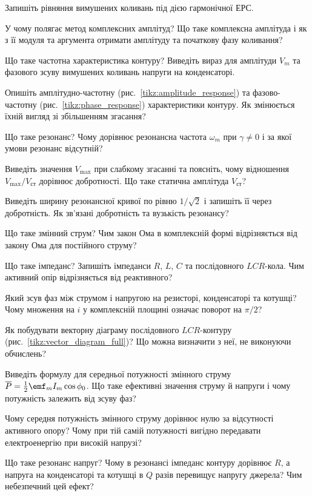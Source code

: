 \begin{Questions}
\begin{quizlist}
	\item Запишіть рівняння вимушених коливань під дією гармонічної ЕРС.
	\item У чому полягає метод комплексних амплітуд? Що таке комплексна амплітуда і як з її модуля та аргумента отримати амплітуду та початкову фазу коливання?
	\item Що таке частотна характеристика контуру? Виведіть вираз для амплітуди $V_m$ та фазового зсуву вимушених коливань напруги на конденсаторі.
	\item Опишіть амплітудно-частотну (рис.~\ref{tikz:amplitude_response}) та фазово-частотну (рис.~\ref{tikz:phase_response}) характеристики контуру. Як змінюється їхній вигляд зі збільшенням згасання?
	\item Що таке резонанс? Чому дорівнює резонансна частота $\omega_m$ при $\gamma\ne0$ і за якої умови резонанс відсутній?
	\item Виведіть значення $V_{\max}$ при слабкому згасанні та поясніть, чому відношення $V_{\max}/V_{\text{ст}}$ дорівнює добротності. Що таке статична амплітуда $V_{\text{ст}}$?
	\item Виведіть ширину резонансної кривої по рівню $1/\sqrt2$ і запишіть її через добротність. Як зв'язані добротність та вузькість резонансу?
	\item Що таке змінний струм? Чим закон Ома в комплексній формі відрізняється від закону Ома для постійного струму?
	\item Що таке імпеданс? Запишіть імпеданси $R$, $L$, $C$ та послідовного $LCR$-кола. Чим активний опір відрізняється від реактивного?
	\item Який зсув фаз між струмом і напругою на резисторі, конденсаторі та котушці? Чому множення на $i$ у комплексній площині означає поворот на $\pi/2$?
	\item Як побудувати векторну діаграму послідовного $LCR$-контуру (рис.~\ref{tikz:vector_diagram_full})? Що можна визначити з неї, не виконуючи обчислень?
	\item Виведіть формулу для середньої потужності змінного струму $\overline P = \frac12\emf_mI_m\cos\phi_0$. Що таке ефективні значення струму й напруги і чому потужність залежить від зсуву фаз?
	\item Чому середня потужність змінного струму дорівнює нулю за відсутності активного опору? Чому при тій самій потужності вигідно передавати електроенергію при високій напрузі?
	\item Що таке резонанс напруг? Чому в резонансі імпеданс контуру дорівнює $R$, а напруга на конденсаторі та котушці в $Q$ разів перевищує напругу джерела? Чим небезпечний цей ефект?

\end{quizlist}
\end{Questions}
